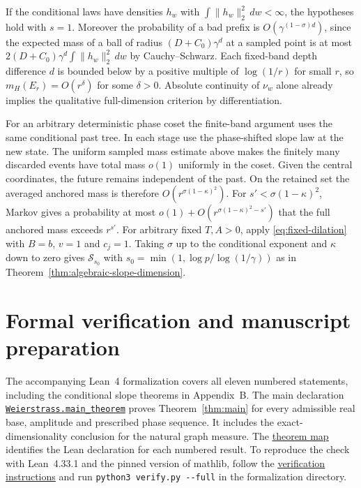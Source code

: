 \documentclass[11pt,a4paper]{article}
\begin{document}
If the conditional laws have densities $h_w$ with
$\int\|h_w\|_2^2\,dw<\infty$, the hypotheses hold with $s=1$.
Moreover the probability of a bad prefix is
$O(\gamma^{(1-\sigma)d})$, since the expected mass of a ball of
radius $(D+C_0)\gamma^d$ at a sampled point is at most
$2(D+C_0)\gamma^d\int\|h_w\|_2^2\,dw$ by Cauchy--Schwarz.
Each fixed-band depth difference $d$ is bounded below by a positive
multiple of $\log(1/r)$ for small $r$, so $m_H(E_r)=O(r^\delta)$
for some $\delta>0$. Absolute continuity of $\nu_w$ alone already
implies the qualitative full-dimension criterion by differentiation.


For an arbitrary deterministic phase coset the finite-band argument uses the same conditional past tree. In each stage use the phase-shifted slope law at the new state. The uniform sampled mass estimate above makes the finitely many discarded events have total mass $o(1)$ uniformly in the coset. Given the central coordinates, the future remains independent of the past. On the retained set the averaged anchored mass is therefore $O(r^{\sigma(1-\kappa)^2})$. For $s'<\sigma(1-\kappa)^2$, Markov gives a probability at most $o(1)+O(r^{\sigma(1-\kappa)^2-s'})$ that the full anchored mass exceeds $r^{s'}$. For arbitrary fixed $T,A>0$, apply \eqref{eq:fixed-dilation} with
$B=b$, $v=1$ and $c_j=1$. Taking $\sigma$ up to the conditional
exponent and $\kappa$ down to zero gives $\mathcal S_{s_0}$ with $s_0=\min(1,\log p/\log(1/\gamma))$ as in Theorem~\ref{thm:algebraic-slope-dimension}.


\section*{Formal verification and manuscript preparation}
The accompanying Lean~4 formalization covers all eleven numbered statements,
including the conditional slope theorems in Appendix~B.
The main declaration
\href{https://github.com/ppadfoot/weierstrass-real-bases/blob/v1.1.0/formalization/Weierstrass/MainTheorem.lean}{\texttt{Weierstrass.main\_theorem}}
proves Theorem~\ref{thm:main} for every admissible real base, amplitude
and prescribed phase sequence. It includes the exact-dimensionality
conclusion for the natural graph measure. The
\href{https://github.com/ppadfoot/weierstrass-real-bases/blob/v1.1.0/formalization/THEOREM_MAP.md}{\underline{theorem map}}
identifies the Lean declaration for each numbered result. To reproduce the
check with Lean~4.33.1 and the pinned version of mathlib, follow the
\href{https://github.com/ppadfoot/weierstrass-real-bases/blob/v1.1.0/formalization/README.md}{\underline{verification instructions}}
and run \texttt{python3 verify.py -{}-full} in the formalization directory.
\end{document}
